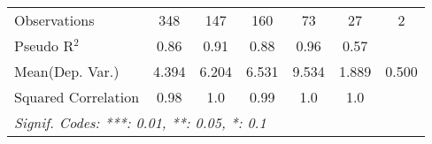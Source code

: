 \begin{tabular}{lcccccc}
   Observations                                               & 348           & 147     & 160       & 73      & 27            & 2\\  
   Pseudo R$^2$                                               & 0.86          & 0.91    & 0.88      & 0.96    & 0.57          & \\  
Mean(Dep. Var.) & 4.394 & 6.204 & 6.531 & 9.534 & 1.889 & 0.500 \\
   Squared Correlation                                        & 0.98          & 1.0     & 0.99      & 1.0     & 1.0           & \\  
   \midrule \midrule
   \multicolumn{7}{l}{\emph{Signif. Codes: ***: 0.01, **: 0.05, *: 0.1}}\\
\end{tabular}
\par\endgroup
